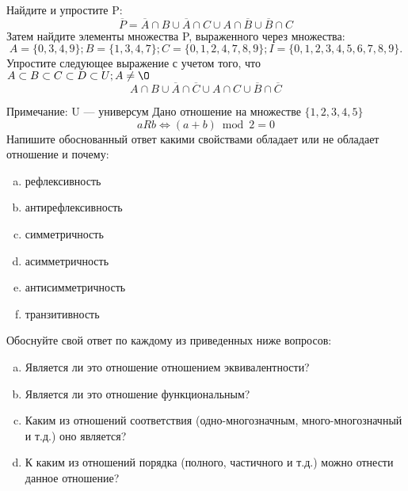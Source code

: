 \documentclass[10pt]{exam}
\begin{document}
\begin{questions}
\question
Найдите и упростите P:
\begin{equation*}
\overline{P} = \overline{A} \cap B \cup \overline{A} \cap C \cup A \cap \overline{B} \cup \overline{B} \cap C
\end{equation*}
Затем найдите элементы множества P, выраженного через множества:
\begin{equation*}
A = \{0, 3, 4, 9\}; 
B = \{1, 3, 4, 7\};
C = \{0, 1, 2, 4, 7, 8, 9\};
I = \{0, 1, 2, 3, 4, 5, 6, 7, 8, 9\}.
\end{equation*}\question
Упростите следующее выражение с учетом того, что $A\subset B \subset C \subset D \subset U; A \neq \O$
\begin{equation*}
A \cap B \cup \overline{A} \cap \overline{C} \cup A \cap C \cup \overline{B} \cap \overline{C}
\end{equation*}

Примечание: U — универсум\question
Дано отношение на множестве $\{1, 2, 3, 4, 5\}$ 
\begin{equation*}
aRb \iff (a+b) \bmod 2 =0
\end{equation*}
Напишите обоснованный ответ какими свойствами обладает или не обладает отношение и почему:   
\begin{enumerate} [a)]\setcounter{enumi}{0}
\item рефлексивность
\item антирефлексивность
\item симметричность
\item асимметричность
\item антисимметричность
\item транзитивность
\end{enumerate}

Обоснуйте свой ответ по каждому из приведенных ниже вопросов:
\begin{enumerate} [a)]\setcounter{enumi}{0}
    \item Является ли это отношение отношением эквивалентности?
    \item Является ли это отношение функциональным?
    \item Каким из отношений соответствия (одно-многозначным, много-многозначный и т.д.) оно является?
    \item К каким из отношений порядка (полного, частичного и т.д.) можно отнести данное отношение?
\end{enumerate}




\end{questions}
\end{document}
